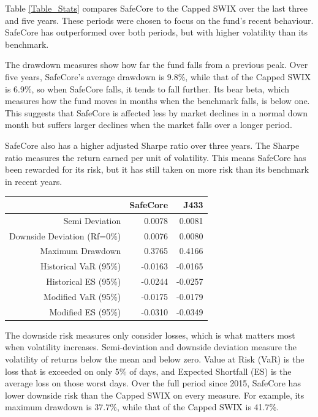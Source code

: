 \documentclass[11pt,preprint, authoryear]{elsarticle}
\let\origtable\table
\let\endorigtable\endtable
\renewenvironment{table}[1][2] {
    \expandafter\origtable\expandafter[H]
} {
    \endorigtable
}
\numberwithin{equation}{section}
\numberwithin{figure}{section}
\numberwithin{table}{section}
\begin{document}
Table \ref{Table_Stats} compares SafeCore to the Capped SWIX over the
last three and five years. These periods were chosen to focus on the
fund's recent behaviour. SafeCore has outperformed over both periods,
but with higher volatility than its benchmark.

The drawdown measures show how far the fund falls from a previous peak.
Over five years, SafeCore's average drawdown is 9.8\%, while that of the
Capped SWIX is 6.9\%, so when SafeCore falls, it tends to fall further.
Its bear beta, which measures how the fund moves in months when the
benchmark falls, is below one. This suggests that SafeCore is affected
less by market declines in a normal down month but suffers larger
declines when the market falls over a longer period.

SafeCore also has a higher adjusted Sharpe ratio over three years. The
Sharpe ratio measures the return earned per unit of volatility. This
means SafeCore has been rewarded for its risk, but it has still taken on
more risk than its benchmark in recent years.

\begin{table}[H]
\centering
\begin{tabular}{rrr}
  \hline
 & SafeCore & J433 \\ 
  \hline
Semi Deviation & 0.0078 & 0.0081 \\ 
  Downside Deviation (Rf=0\%) & 0.0076 & 0.0080 \\ 
  Maximum Drawdown & 0.3765 & 0.4166 \\ 
  Historical VaR (95\%) & -0.0163 & -0.0165 \\ 
  Historical ES (95\%) & -0.0244 & -0.0257 \\ 
  Modified VaR (95\%) & -0.0175 & -0.0179 \\ 
  Modified ES (95\%) & -0.0310 & -0.0349 \\ 
   \hline
\end{tabular}
\caption{Downside risk measures: SafeCore vs Capped SWIX \label{Table_Downside}} 
\end{table}

The downside risk measures only consider losses, which is what matters
most when volatility increases. Semi-deviation and downside deviation
measure the volatility of returns below the mean and below zero. Value
at Risk (VaR) is the loss that is exceeded on only 5\% of days, and
Expected Shortfall (ES) is the average loss on those worst days. Over
the full period since 2015, SafeCore has lower downside risk than the
Capped SWIX on every measure. For example, its maximum drawdown is
37.7\%, while that of the Capped SWIX is 41.7\%.
\end{document}
